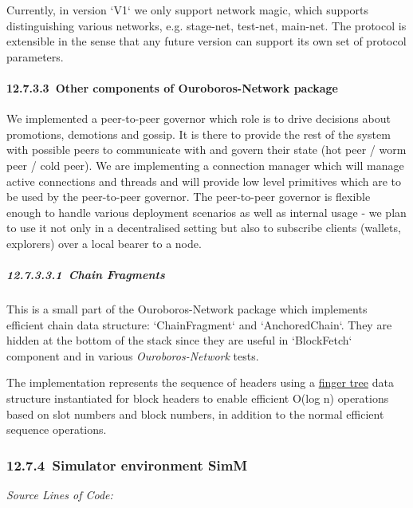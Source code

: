 \documentclass[]{article}
\let\oldparagraph\paragraph
\renewcommand{\paragraph}[1]{\oldparagraph{#1}\mbox{}}
\let\oldsubparagraph\subparagraph
\renewcommand{\subparagraph}[1]{\oldsubparagraph{#1}\mbox{}}
\begin{document}
Currently, in version `V1` we only support network magic, which supports
distinguishing various networks, e.g. stage-net, test-net, main-net. The
protocol is extensible in the sense that any future version can support
its own set of protocol parameters.

\hypertarget{other-components-of-ouroboros-network-package}{%
\paragraph{​12.7.3.3​~Other components of Ouroboros-Network
package}\label{other-components-of-ouroboros-network-package}}

We implemented a peer-to-peer governor which role is to drive decisions
about promotions, demotions and gossip. It is there to provide the rest
of the system with possible peers to communicate with and govern their
state (hot peer / worm peer / cold peer). We are implementing a
connection manager which will manage active connections and threads and
will provide low level primitives which are to be used by the
peer-to-peer governor. The peer-to-peer governor is flexible enough to
handle various deployment scenarios as well as internal usage - we plan
to use it not only in a decentralised setting but also to subscribe
clients (wallets, explorers) over a local bearer to a node.

\hypertarget{chain-fragments}{%
\subparagraph{​12.7.3.3.1​~Chain Fragments}\label{chain-fragments}}

This is a small part of the Ouroboros-Network package which implements
efficient chain data structure: `ChainFragment` and `AnchoredChain`.
They are hidden at the bottom of the stack since they are useful in
`BlockFetch` component and in various \emph{Ouroboros-Network} tests.

The implementation represents the sequence of headers using a
\href{http://www.staff.city.ac.uk/~ross/papers/FingerTree.html}{finger
tree} data structure instantiated for block headers to enable efficient
O(log n) operations based on slot numbers and block numbers, in addition
to the normal efficient sequence operations.

\hypertarget{simulator-environment-simm}{%
\subsubsection{​12.7.4​~Simulator environment
SimM}\label{simulator-environment-simm}}

\emph{Source Lines of Code:\\
}
\end{document}
